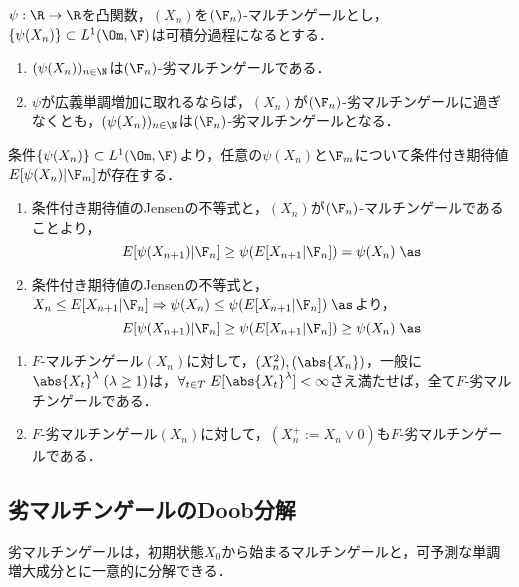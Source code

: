 \documentclass[uplatex,dvipdfmx]{jsreport}
\begin{document}
\begin{lemma}[劣マルチンゲールの構成]
    $\psi:\R\to\R$を凸関数，$(X_n)$を$(\F_n)$-マルチンゲールとし，$\{\psi(X_n)\}\subset L^1(\Om,\F)$は可積分過程になるとする．
    \begin{enumerate}
        \item $(\psi(X_n))_{n\in\N}$は$(\F_n)$-劣マルチンゲールである．
        \item $\psi$が広義単調増加に取れるならば，$(X_n)$が$(\F_n)$-劣マルチンゲールに過ぎなくとも，$(\psi(X_n))_{n\in\N}$は$(\F_n)$-劣マルチンゲールとなる．
    \end{enumerate}
\end{lemma}
\begin{Proof}
    条件$\{\psi(X_n)\}\subset L^1(\Om,\F)$より，任意の$\psi(X_n)$と$\F_m$について条件付き期待値$E[\psi(X_n)|\F_m]$が存在する．
    \begin{enumerate}
        \item 条件付き期待値のJensenの不等式と，$(X_n)$が$(\F_n)$-マルチンゲールであることより，
        \[E[\psi(X_{n+1})|\F_n]\ge\psi(E[X_{n+1}|\F_n])=\psi(X_n)\;\as\]
        \item 条件付き期待値のJensenの不等式と，$X_n\le E[X_{n+1}|\F_n]\Rightarrow\psi(X_n)\le\psi(E[X_{n+1}|\F_n])\;\as$より，
        \[E[\psi(X_{n+1})|\F_n]\ge\psi(E[X_{n+1}|\F_n])\ge\psi(X_n)\;\as\]
    \end{enumerate}
\end{Proof}

\begin{example}[マルチンゲールに付属する劣マルチンゲール]\mbox{}
    \begin{enumerate}
        \item $F$-マルチンゲール$(X_n)$に対して，$(X_n^2),(\abs{X_n})$，一般に$\abs{X_t}^\lambda\;(\lambda\ge1)$は，$\forall_{t\in T}\; E[\abs{X_t}^\lambda]<\infty$さえ満たせば，全て$F$-劣マルチンゲールである．
        \item $F$-劣マルチンゲール$(X_n)$に対して，$(X_n^+:=X_n\lor0)$も$F$-劣マルチンゲールである．
    \end{enumerate}
\end{example}

\subsection{劣マルチンゲールのDoob分解}

\begin{tcolorbox}[colframe=ForestGreen, colback=ForestGreen!10!white,breakable,colbacktitle=ForestGreen!40!white,coltitle=black,fonttitle=\bfseries\sffamily,
title=]
    劣マルチンゲールは，初期状態$X_0$から始まるマルチンゲールと，可予測な単調増大成分とに一意的に分解できる．
\end{tcolorbox}
\end{document}
